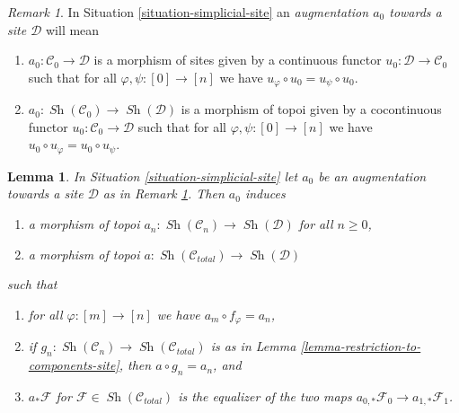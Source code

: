 \documentclass{stacks-project}
\theoremstyle{plain}
\newtheorem{lemma}[subsection]{Lemma}
\theoremstyle{definition}
\theoremstyle{remark}
\newtheorem{remark}[subsection]{Remark}
\numberwithin{equation}{subsection}
\def\Sh{\mathop{\mathit{Sh}}\nolimits}
\begin{document}
\begin{remark}
\label{remark-augmentation-site}
In Situation \ref{situation-simplicial-site} an
{\it augmentation $a_0$ towards a site $\mathcal{D}$} will mean
\begin{enumerate}
\item[(A)] $a_0 : \mathcal{C}_0 \to \mathcal{D}$ is a morphism of sites
given by a continuous functor $u_0 : \mathcal{D} \to \mathcal{C}_0$
such that for all $\varphi, \psi : [0] \to [n]$ we have
$u_\varphi \circ u_0 = u_\psi \circ u_0$.
\item[(B)] $a_0 : \Sh(\mathcal{C}_0) \to \Sh(\mathcal{D})$ is a morphism
of topoi given by a cocontinuous functor $u_0 : \mathcal{C}_0 \to \mathcal{D}$
such that for all $\varphi, \psi : [0] \to [n]$ we have
$u_0 \circ u_\varphi = u_0 \circ u_\psi$.
\end{enumerate}
\end{remark}

\begin{lemma}
\label{lemma-augmentation-site}
In Situation \ref{situation-simplicial-site} let $a_0$ be an
augmentation towards a site $\mathcal{D}$ as in
Remark \ref{remark-augmentation-site}. Then $a_0$ induces
\begin{enumerate}
\item a morphism of topoi $a_n : \Sh(\mathcal{C}_n) \to \Sh(\mathcal{D})$
for all $n \geq 0$,
\item a morphism of topoi $a : \Sh(\mathcal{C}_{total}) \to \Sh(\mathcal{D})$
\end{enumerate}
such that
\begin{enumerate}
\item for all $\varphi : [m] \to [n]$ we have $a_m \circ f_\varphi = a_n$,
\item if $g_n : \Sh(\mathcal{C}_n) \to \Sh(\mathcal{C}_{total})$
is as in Lemma \ref{lemma-restriction-to-components-site}, then
$a \circ g_n = a_n$, and
\item $a_*\mathcal{F}$ for $\mathcal{F} \in \Sh(\mathcal{C}_{total})$
is the equalizer of the two maps
$a_{0, *}\mathcal{F}_0 \to a_{1, *}\mathcal{F}_1$.
\end{enumerate}
\end{lemma}
\end{document}
